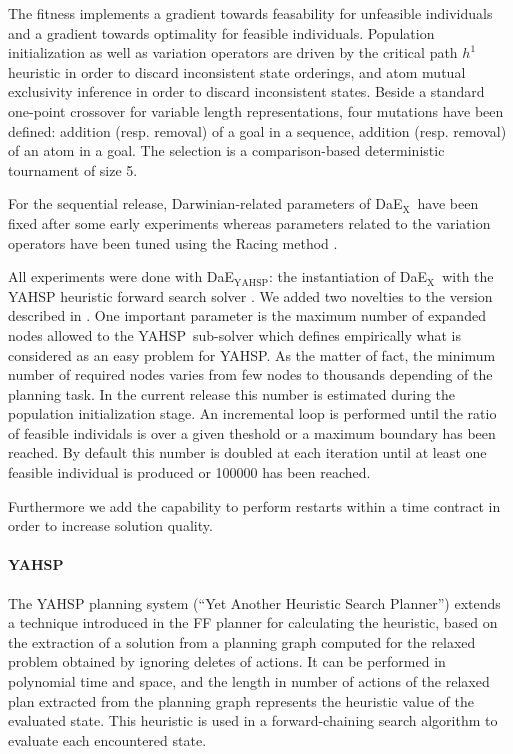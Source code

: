\documentclass{sig-alternate}
\newcommand{\DAEX}{{\sc DaE$_{\text{X}}$}}
\newcommand{\DAEYAHSP}{{\sc DaE$_{\text{YAHSP}}$}}
\newcommand{\YAHSP}{{\sc YAHSP}}
\begin{document}
The fitness implements a gradient towards feasability for unfeasible individuals and a gradient towards optimality for feasible individuals.
Population initialization as well as variation operators are driven by the critical path $h^1$ heuristic \cite{h1:aips2000} in order to discard inconsistent state orderings, and atom mutual exclusivity inference in order to discard inconsistent states.
Beside a standard one-point crossover for variable length representations, four mutations have been defined: addition (resp. removal) of a goal in a sequence, addition (resp. removal) of an atom in a goal.
The selection is a comparison-based deterministic tournament of size 5.

For the sequential release, Darwinian-related parameters of \DAEX\ have been fixed after some early experiments \cite{dae:evocop2006} whereas 
parameters related to the variation operators have been tuned using the Racing method \cite{dae:gecco2010}.

All experiments were done with \DAEYAHSP: the instantiation of \DAEX\ with the YAHSP heuristic forward search solver \cite{yahsp:icaps2004}. %
We added two novelties to the version described in \cite{dae:icaps2010}. 
One important parameter is the maximum number of expanded nodes allowed to the \YAHSP\ sub-solver which defines empirically what is considered as an easy problem for \YAHSP. As the matter of fact, the minimum number of required nodes varies from few nodes to thousands depending of the planning task. 
In the current release this number is estimated during the population initialization stage. An incremental loop is performed until the ratio of feasible individals is over a given theshold or a maximum boundary has been reached. By default this number is doubled at each iteration until at least one feasible individual is produced or 100000 has been reached.

Furthermore we add the capability to perform restarts within a time contract in order to increase solution quality.

\paragraph{YAHSP} %

The   YAHSP  planning   system  (``Yet   Another  Heuristic   Search  Planner'')
\cite{yahsp:icaps2004}  extends  a  technique   introduced  in  the  FF  planner
\cite{ff:jair01}  for calculating  the  heuristic, based  on  the extraction  of
a solution  from a planning graph  computed for the relaxed  problem obtained by
ignoring deletes of actions.  It can  be performed in polynomial time and space,
and  the length in  number of  actions of  the relaxed  plan extracted  from the
planning  graph represents  the heuristic  value of  the evaluated  state.  This
heuristic  is used  in  a  forward-chaining search  algorithm  to evaluate  each
encountered state.
\end{document}
